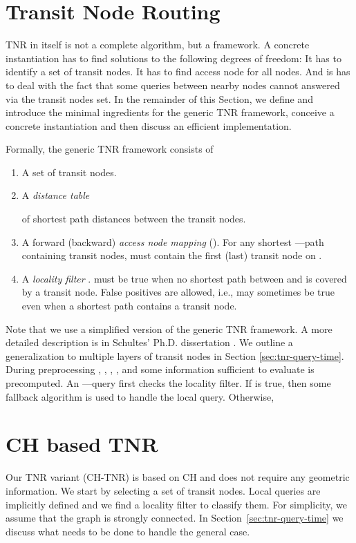 \documentclass{llncs}
\begin{document}
\section{Transit Node Routing}
\label{sec:tnr-tnr}

TNR in itself is not a complete algorithm, but a framework.
A concrete instantiation has to find solutions to the following degrees of freedom:
It has to identify a set of transit nodes.
It has to find access node for all nodes.
And is has to deal with the fact that some queries between nearby nodes cannot answered via the transit nodes set.
In the remainder of this Section, we define and introduce the minimal ingredients for the generic TNR framework, conceive a concrete instantiation and then discuss an efficient implementation.

\begin{definition}
\label{tnr:dfn-tnr}
Formally, the generic TNR framework consists of
\begin{enumerate}
\item A set  of transit nodes.
\item A \textit{distance table} 
  
  of shortest path distances between the transit nodes.
\item A forward (backward) \textit{access node mapping}  ().  For any shortest ---path  containing transit nodes,   must contain the first (last) transit node on .
\item A \textit{locality filter} 
  .   
   must be true when no shortest path   
  between  and  is covered by a transit node. 
  False positives are allowed, i.e.,  may sometimes 
  be true even when a shortest path
  contains a transit node.
\end{enumerate}
\end{definition}
Note that we use a simplified version of the generic TNR framework. 
A more detailed description is in Schultes' Ph.D. dissertation \cite{s-rprn-08}.
We outline a generalization to multiple layers of transit nodes in Section \ref{sec:tnr-query-time}.
During preprocessing , , , , and some information sufficient to evaluate  is precomputed. An ---query first checks the locality filter. If   is true, then some fallback algorithm is used to handle the local query. Otherwise, 



\section{CH based TNR}\label{sec:tnr-our-variant}
Our TNR variant  (CH-TNR) is based on CH and does not require any geometric information. We start by selecting a set of transit nodes. 
Local queries are implicitly defined and we find a locality filter to classify them. For simplicity, we assume that the graph is strongly connected. In Section~\ref{sec:tnr-query-time} we discuss what needs to be done to handle the general case.
\end{document}
